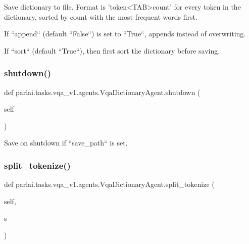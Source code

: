\begin{DoxyVerb}Save dictionary to file. Format is 'token<TAB>count' for every token in the
dictionary, sorted by count with the most frequent words first.

If ``append`` (default ``False``) is set to ``True``, appends instead
of overwriting.

If ``sort`` (default ``True``), then first sort the dictionary before
saving.
\end{DoxyVerb}
 \mbox{\label{classparlai_1_1tasks_1_1vqa__v1_1_1agents_1_1VqaDictionaryAgent_afcebdb70582204709f5e4365dde00bcb}} 
\subsubsection{\texorpdfstring{shutdown()}{shutdown()}}
{\footnotesize\ttfamily def parlai.\+tasks.\+vqa\+\_\+v1.\+agents.\+Vqa\+Dictionary\+Agent.\+shutdown (\begin{DoxyParamCaption}\item[{}]{self }\end{DoxyParamCaption})}

\begin{DoxyVerb}Save on shutdown if ``save_path`` is set.
\end{DoxyVerb}
 \mbox{\label{classparlai_1_1tasks_1_1vqa__v1_1_1agents_1_1VqaDictionaryAgent_a59f1738f5c3fdcadd0a8ece0d53c5d6e}} 
\subsubsection{\texorpdfstring{split\+\_\+tokenize()}{split\_tokenize()}}
{\footnotesize\ttfamily def parlai.\+tasks.\+vqa\+\_\+v1.\+agents.\+Vqa\+Dictionary\+Agent.\+split\+\_\+tokenize (\begin{DoxyParamCaption}\item[{}]{self,  }\item[{}]{s }\end{DoxyParamCaption})}

